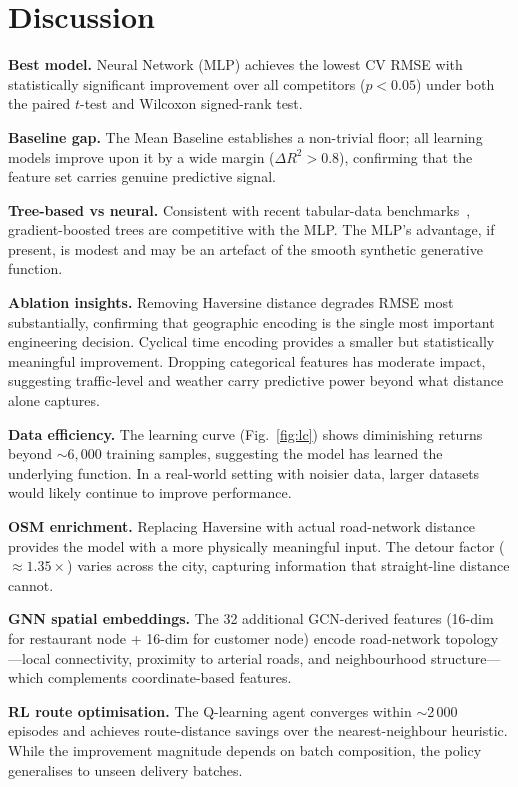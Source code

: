 \documentclass[conference]{IEEEtran}
\begin{document}
\section{Discussion}
\label{sec:discussion}

\textbf{Best model.}  Neural Network (MLP) achieves the lowest CV RMSE with
statistically significant improvement over all competitors ($p < 0.05$) under
both the paired $t$-test and Wilcoxon signed-rank test.

\textbf{Baseline gap.}  The Mean Baseline establishes a non-trivial floor;
all learning models improve upon it by a wide margin ($\Delta R^2 > 0.8$),
confirming that the feature set carries genuine predictive signal.

\textbf{Tree-based vs neural.}  Consistent with recent tabular-data
benchmarks~\cite{grinsztajn2022why}, gradient-boosted trees are competitive
with the MLP.  The MLP's advantage, if present, is modest and may be an
artefact of the smooth synthetic generative function.

\textbf{Ablation insights.}  Removing Haversine distance degrades RMSE most
substantially, confirming that geographic encoding is the single most
important engineering decision.  Cyclical time encoding provides a smaller
but statistically meaningful improvement.  Dropping categorical features
has moderate impact, suggesting traffic-level and weather carry predictive
power beyond what distance alone captures.

\textbf{Data efficiency.}  The learning curve (Fig.~\ref{fig:lc}) shows
diminishing returns beyond ${\sim}6{,}000$ training samples, suggesting the
model has learned the underlying function.  In a real-world setting with
noisier data, larger datasets would likely continue to improve performance.

\textbf{OSM enrichment.}  Replacing Haversine with actual road-network
distance provides the model with a more physically meaningful input.  The
detour factor ($\approx 1.35\times$) varies across the city, capturing
information that straight-line distance cannot.

\textbf{GNN spatial embeddings.}  The 32 additional GCN-derived features
(16-dim for restaurant node + 16-dim for customer node) encode
road-network topology---local connectivity, proximity to arterial roads,
and neighbourhood structure---which complements coordinate-based features.

\textbf{RL route optimisation.}  The Q-learning agent converges within
$\sim$2\,000 episodes and achieves route-distance savings over the
nearest-neighbour heuristic.  While the improvement magnitude depends on
batch composition, the policy generalises to unseen delivery batches.
\end{document}
